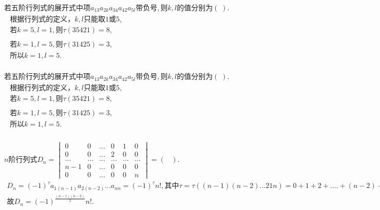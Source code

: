 $\mathrm{若五阶行列式的展开式中项}a_{13}a_{2k}a_{34}a_{42}a_{5l}\mathrm{带负号},\mathrm 则k,l\mathrm{的值分别为}(\;).$
$\begin{array}{l}\begin{array}{l}\mathrm{根据行列式的定义}，k,l\mathrm{只能取}1或5,\\若k=5,l=1,则\tau(35421)=8,\end{array}\\\begin{array}{l}若k=1,l=5,则\tau(31425)=3,\\\mathrm{所以}k=1,l=5.\\\end{array}\end{array}$

$\mathrm{若五阶行列式的展开式中项}a_{13}a_{2k}a_{34}a_{42}a_{5l}\mathrm{带负号},\mathrm 则k,l\mathrm{的值分别为}(\;).$
$\begin{array}{l}\begin{array}{l}\mathrm{根据行列式的定义}，k,l\mathrm{只能取}1或5,\\若k=5,l=1,则\tau(35421)=8,\end{array}\\\begin{array}{l}若k=1,l=5,则\tau(31425)=3,\\\mathrm{所以}k=1,l=5.\\\end{array}\end{array}$

$n\mathrm{阶行列式}D_n=\begin{vmatrix}0&0&...&0&1&0\\0&0&...&2&0&0\\...&...&...&...&...&...\\n-1&0&...&0&0&0\\0&0&...&0&0&n\end{vmatrix}=(\;\;\;).$
$\begin{array}{l}D_n=(-1)^\tau a_{1(n-1)}a_{2(n-2)}...a_{nn}=(-1)^\tau n!,\mathrm{其中}\tau=\tau((n-1)(n-2)...21n)=0+1+2+....+(n-2)+0=\frac{(n-1)(n-2)}2\\故D_n=(-1)^\frac{(n-1)(n-2)}2n!.\end{array}$

